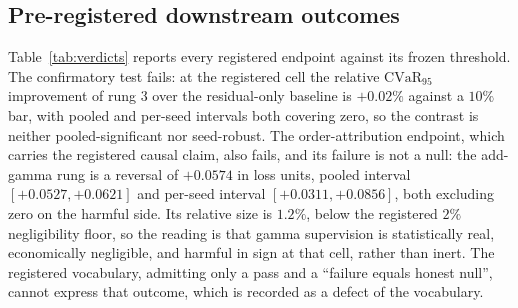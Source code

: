 \documentclass{article}
\begin{document}
\subsection{Pre-registered downstream outcomes}
\label{sec:reg}

Table~\ref{tab:verdicts} reports every registered endpoint against its frozen
threshold. The confirmatory test fails: at the registered cell the relative
$\mathrm{CVaR}_{95}$ improvement of rung 3 over the residual-only baseline is $+0.02\%$
against a $10\%$ bar, with pooled and per-seed intervals both covering zero, so the
contrast is neither pooled-significant nor seed-robust. The order-attribution
endpoint, which carries the registered causal claim, also fails, and its failure is
not a null: the add-gamma rung is a reversal of $+0.0574$ in loss units, pooled
interval $[+0.0527, +0.0621]$ and per-seed interval $[+0.0311, +0.0856]$, both
excluding zero on the harmful side. Its relative size is $1.2\%$, below the
registered $2\%$ negligibility floor, so the reading is that gamma supervision is
statistically real, economically negligible, and harmful in sign at that cell,
rather than inert. The registered vocabulary, admitting only a pass and a
``failure equals honest null'', cannot express that outcome, which is recorded as a
defect of the vocabulary.
\end{document}
